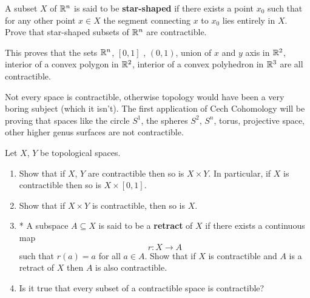 \begin{ques}
	A subset $ X$ of $ \mathbb{R}^n$ is said to be \textbf{star-shaped} if there exists a point $x_0$ such that for any other point $x \in X$ the segment connecting $x$ to $x_0$ lies entirely in $ X$. Prove that star-shaped subsets of $\mathbb{R}^n$ are contractible.
\end{ques}
\begin{remark}
	This proves that the sets $\mathbb{R}^n$, $ [0,1]$ , $(0,1) $, union of $ x$ and $ y$ axis in $ \mathbb{R}^2$, interior of a convex polygon in $\mathbb{R}^2$, interior of a convex polyhedron in $\mathbb{R}^3$ are all contractible.
\end{remark}
	Not every space is contractible, otherwise topology would have been a very boring subject (which it isn't). The first application of Cech Cohomology will be proving that spaces like the circle $ S^1$, the spheres $ S^2$, $ S^n$, torus, projective space, other higher genus surfaces are {not} contractible.\\

	\begin{ques} Let $X$, $Y$ be topological spaces.
		\begin{enumerate}
			\item Show that if $X$, $Y$ are contractible then so is $X \times Y$. In particular, if $ X$ is contractible then so is $ X \times [0,1]$.
			\item Show that if $ X \times Y$ is contractible, then so is $ X$.
			\item* A subspace $ A \subseteq X$ is said to be a \textbf{retract} of $ X$ if there exists a continuous map $$ r: X \rightarrow A$$ such that $ r(a) = a$ for all $ a \in A$. Show that if $ X$ is contractible and $ A $ is a retract of $ X$ then $ A$ is also contractible.
			\item Is it true that every subset of a contractible space is contractible?
		\end{enumerate}
	\end{ques}

